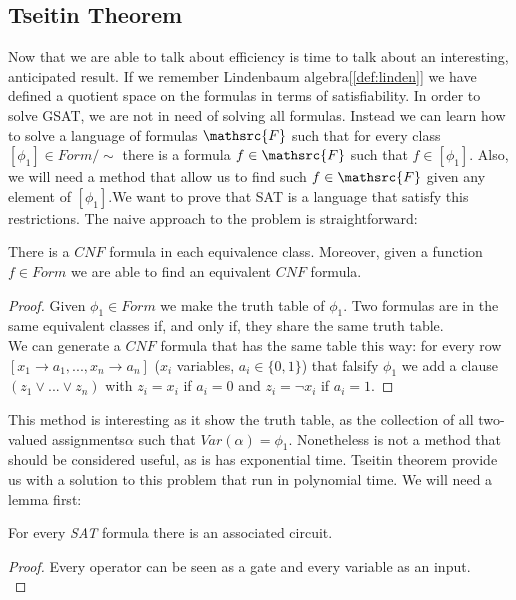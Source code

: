 \subsection{Tseitin Theorem}
Now that we are able to talk about efficiency is time to talk about an interesting, anticipated result. If we remember Lindenbaum algebra[\ref{def:linden}] we have defined a quotient space on the formulas in terms of satisfiability. In order to solve GSAT, we are not in need of solving all formulas.  Instead we can learn how to solve a language of formulas $\mathsrc{F}$ such that for every class $[\phi_1]\in Form/\sim$ there  is a formula $f\in\mathsrc{F}$ such that $f \in [\phi_1]$. Also, we will need a method that allow us to find such $f\in\mathsrc{F}$ given any element of $[\phi_1]$.We want to prove that SAT is a language that satisfy this restrictions. The naive approach to the problem is straightforward:\\

\begin{proposition}
  There is a $CNF$ formula in each equivalence class. Moreover, given a function $f\in Form$ we are able to find an equivalent $CNF$ formula.
\end{proposition}
\begin{proof}
 Given $\phi_1 \in Form$ we make the truth table of $\phi_1$. Two formulas are in the same equivalent classes if, and only if, they share the same truth table. \\

  We can generate a $CNF$ formula that has the same table this way: for every row $[x_1\to a_1,...,x_n\to a_n]$ ($x_i$ variables, $a_i\in \{0,1\}$) that falsify $\phi_1$ we add a clause $(z_1\vee ... \vee z_n)$ with $z_i = x_i$ if $a_i = 0$ and  $z_i =\neg x_i$ if $a_i = 1$.
\end{proof}


  This method is interesting as it show the truth table, as the collection of all two-valued assignments$\alpha$ such that $Var(\alpha) = \phi_1$. Nonetheless is not a method that should be considered useful, as is has exponential time. Tseitin theorem provide us with a solution to this problem that run in polynomial time. We will need a lemma first:

  \begin{lemma}
    For every \emph{SAT} formula there is an associated circuit.
  \end{lemma}
  \begin{proof}
    Every operator can be seen as a gate and every variable as an input.\\
  \end{proof}
  
